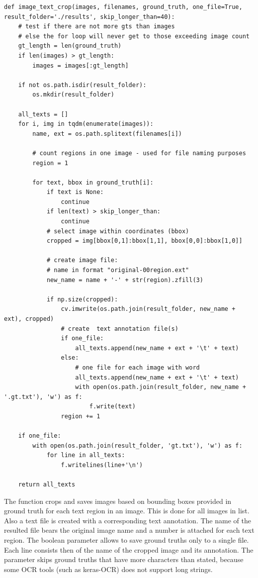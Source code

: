 \begin{lstlisting}[caption=image\_text\_crop]
def image_text_crop(images, filenames, ground_truth, one_file=True, result_folder='./results', skip_longer_than=40):
    # test if there are not more gts than images
    # else the for loop will never get to those exceeding image count
    gt_length = len(ground_truth)
    if len(images) > gt_length:
        images = images[:gt_length]

    if not os.path.isdir(result_folder):
        os.mkdir(result_folder)

    all_texts = []
    for i, img in tqdm(enumerate(images)):
        name, ext = os.path.splitext(filenames[i])

        # count regions in one image - used for file naming purposes
        region = 1
        
        for text, bbox in ground_truth[i]:
            if text is None:
                continue
            if len(text) > skip_longer_than:
                continue
            # select image within coordinates (bbox)
            cropped = img[bbox[0,1]:bbox[1,1], bbox[0,0]:bbox[1,0]]

            # create image file:
            # name in format "original-00region.ext"
            new_name = name + '-' + str(region).zfill(3)
            
            if np.size(cropped):
                cv.imwrite(os.path.join(result_folder, new_name + ext), cropped)
                # create  text annotation file(s)
                if one_file:
                    all_texts.append(new_name + ext + '\t' + text)
                else:
                    # one file for each image with word
                    all_texts.append(new_name + ext + '\t' + text)
                    with open(os.path.join(result_folder, new_name + '.gt.txt'), 'w') as f:
                        f.write(text)
                region += 1

    if one_file:
        with open(os.path.join(result_folder, 'gt.txt'), 'w') as f:
            for line in all_texts:
                f.writelines(line+'\n')

    return all_texts
\end{lstlisting}

The function  crops and saves images based on bounding boxes provided in ground truth for each text region in an image. This is done for all images in  list. Also a text file is created with a corresponding text annotation. The name of the resulted file bears the original image name and a number is attached for each text region. The boolean parameter  allows to save ground truths only to a single file. Each line consists then of the name of the cropped image and its annotation. The parameter  skips ground truths that have more characters than stated, because some OCR tools (such as keras-OCR) does not support long strings.

